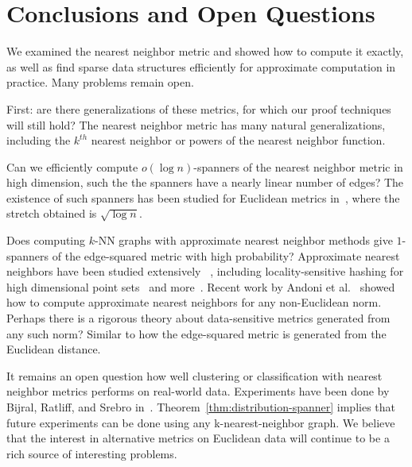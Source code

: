 \section{Conclusions and Open Questions}\label{sec:conclusions}


We examined the nearest neighbor metric and showed how to compute it
exactly, as well as find sparse data structures efficiently for approximate
computation in practice.  Many problems remain open.

First: are there generalizations of these metrics, for which our proof techniques
will still hold? The nearest neighbor metric has many natural
generalizations, including the $k^{th}$ nearest neighbor or powers of the
nearest neighbor function.

Can we efficiently compute $o(\log n)$-spanners of the nearest neighbor
metric in high dimension, such the the spanners have a nearly linear number of edges?
The existence of such spanners has been studied for Euclidean metrics in~\cite{HarPeled13}, where the stretch
obtained is $\sqrt{\log n}$.

Does computing $k$-NN graphs with approximate nearest neighbor methods give $1$-spanners of the
edge-squared metric with high probability?
Approximate nearest neighbors have been studied extensively
~\cite{kNNsurvey, Chen11, Dong11}, including locality-sensitive
hashing for high dimensional point sets~\cite{LSH} and
more~\cite{Laarhoven2018}.
Recent work by Andoni et al.~\cite{Andoni2018} showed how to compute
approximate nearest neighbors for any non-Euclidean norm.  Perhaps there
is a rigorous theory about data-sensitive metrics generated from any such
norm? Similar to
how the edge-squared metric is generated from the Euclidean distance.

It remains an open question how well clustering or
classification with
nearest neighbor metrics performs on real-world
data.
Experiments have been done by Bijral, Ratliff, and
Srebro in~\cite{bijral11semiSupLearningDBD}.
Theorem~\ref{thm:distribution-spanner} implies that future experiments
can be done using any
k-nearest-neighbor graph.  
  We believe that the interest in alternative metrics on Euclidean data will continue to be a rich source of interesting problems.

